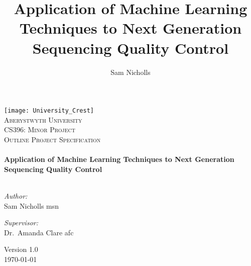 \documentclass[a4paper,times,numbered,print,index,oneside,PageStyleII]{Classes/PhDThesisPSnPDF}
\title{Application of Machine Learning Techniques to Next Generation Sequencing Quality Control}
\author{Sam Nicholls}
\begin{document}
\frontmatter

\begin{titlepage}
\begin{center}

\texttt{[image: University\_Crest]}~\\[1cm]

\textsc{\LARGE Aberystwyth University}\\
\textsc{\Large CS396: Minor Project}\\[1.5cm]

\textsc{\Large Outline Project Specification}\\[0.5cm]

\HRule \\[0.4cm]
{ \huge \bfseries Application of Machine Learning Techniques to Next Generation Sequencing Quality Control \\[0.5cm] }
\HRule \\[1.5cm]

\begin{minipage}{0.4\textwidth}
    \begin{flushleft} \large
        \emph{Author:}\\
        Sam Nicholls \small{msn}
    \end{flushleft}
\end{minipage}
\begin{minipage}{0.4\textwidth}
    \begin{flushright} \large
        \emph{Supervisor:} \\
        Dr.~Amanda Clare \small{afc}
    \end{flushright}
\end{minipage}

\vfill

Version 1.0\\
{\large \today}

\end{center}
\end{titlepage}

%
%
%
%


\end{document}

